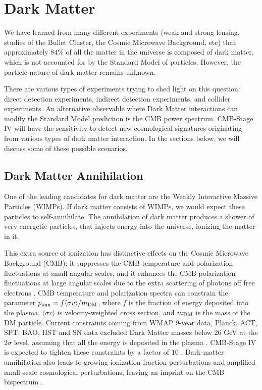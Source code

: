 \section{Dark Matter}

We have learned from many different experiments (weak and strong lensing, studies of the Bullet Cluster, the Cosmic Microwave Background, etc) that approximately $84\%$ of all the matter in the universe is composed of dark matter, which is not accounted for by the Standard Model of particles. However, the particle nature of dark matter remains unknown.

There are various types of experiments trying to shed light on this question: direct detection experiments, indirect detection experiments, and collider experiments. 
An alternative observable where Dark Matter interactions can modify the Standard Model prediction is the CMB power spectrum.
CMB-Stage IV will have the sensitivity to detect new cosmological signatures originating from various types of dark matter interaction. In the sections below, we will discuss some of these possible scenarios.

\subsection{Dark Matter Annihilation}

One of the leading candidates for dark matter are the Weakly Interactive Massive Particles (WIMPs). If dark matter consists of WIMPs, we would expect these particles to self-annihilate. The annihilation of dark matter produces a shower of very energetic particles, that injects energy into the universe, ionizing the matter in it.

This extra source of ionization has distinctive effects on the Cosmic Microwave Background (CMB): it suppresses the CMB temperature and polarization fluctuations at small angular scales, and it enhances the CMB polarization fluctuations at large angular scales due to the extra scattering of photons off free electrons \cite{Chen:2003gz,Padmanabhan:2005es}.
CMB temperature and polarization spectra can constrain the parameter
$p_{\rm ann}=f\langle\sigma v\rangle/m_{\rm DM}$, where $f$ is the fraction of energy
deposited into the plasma, $\langle\sigma v\rangle$ is velocity-weighted
cross section, and $m_{\rm DM}$ is the mass of the DM particle.
Current constraints coming from WMAP 9-year data,
Planck, ACT, SPT, BAO, HST and SN data excluded
Dark Matter masses below $26$ GeV at the 2$\sigma$ level, assuming that
all the energy is deposited in the plasma \cite{Madhavacheril:2013cna}. CMB-Stage IV is expected to tighten these constraints by a factor of $10$ \cite{Wu:2014hta}. Dark-matter annihilation also leads to growing ionization fraction perturbations and amplified small-scale cosmological perturbations, leaving an imprint on the CMB bispectrum \cite{Dvorkin:2013cga}.

